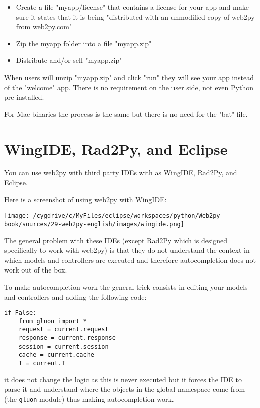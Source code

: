 \documentclass[justified,sixbynine,notoc]{tufte-book}
\def\ft{\small\tt}
\def\inxx#1{\index{#1}}
\begin{document}
\begin{fullwidth}
\begin{itemize}
\item Create a file "myapp/license" that contains a license for your app and make sure it states that it is being "distributed with an unmodified copy of web2py from web2py.com"

\item Zip the myapp folder into a file "myapp.zip"

\item Distribute and/or sell "myapp.zip"
\end{itemize}

When users will unzip "myapp.zip" and click "run" they will see your app instead of the "welcome" app.
There is no requirement on the user side, not even Python pre-installed.

For Mac binaries the process is the same but there is no need for the "bat" file.

\goodbreak\section{WingIDE, Rad2Py, and Eclipse}

\inxx{WingIDE} \inxx{Eclipse} \inxx{Rad2Py}

You can use web2py with third party IDEs with as WingIDE, Rad2Py, and Eclipse.

Here is a screenshot of using web2py with WingIDE:


\goodbreak\begin{center}\texttt{[image: /cygdrive/c/MyFiles/eclipse/workspaces/python/Web2py-book/sources/29-web2py-english/images/wingide.png]}\end{center}


The general problem with these IDEs (except Rad2Py which is designed specifically to work with web2py) is that they do not understand the context in which models and controllers are executed and therefore autocompletion does not work out of the box.

To make autocompletion work the general trick consists in editing your models and controllers and adding the following code:

\begin{lstlisting}
if False:
    from gluon import *
    request = current.request
    response = current.response
    session = current.session
    cache = current.cache
    T = current.T
\end{lstlisting}
\noindent it does not change the logic as this is never executed but it forces the IDE to parse it and understand where the objects in the global namespace come from (the {\ft gluon} module) thus making autocompletion work.


\end{fullwidth}
\end{document}
